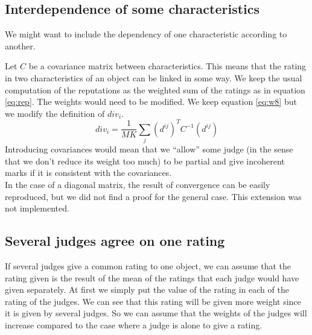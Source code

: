 \documentclass[12pt,a4paper]{article}
\newcommand{\quotes}[1]{``#1''}
\begin{document}
\subsection{Interdependence of some characteristics}
We might want to include the dependency of one characteristic according to another.

Let $C$ be a covariance matrix between characteristics. This means that the rating in two characteristics of an object can be linked in some way. 
We keep the usual computation of the reputations as the weighted sum of the ratings as in equation \ref{eq:rep}. The weights would need to be modified. We keep equation \ref{eq:w8} but we modify the definition of $div_i$.
$$div_i =  \frac{1}{MK}\sum_{j} (d^{ij})^T C^{-1} (d^{ij})$$
Introducing covariances would mean that we \quotes{allow} some judge (in the sense that we don't reduce its weight too much) to be partial and give incoherent marks if it is consistent with the covariances.\\
In the case of a diagonal matrix, the result of convergence can be easily reproduced, but we did not find a proof for the general case. This extension was not implemented.


\subsection{Several judges agree on one rating}
If several judges give a common rating to one object, we can assume that the rating given is the result of the mean of the ratings that each judge would have given separately. At first we simply put the value of the rating in each of the rating of the judges. We can see that this rating will be given more weight since it is given by several judges. So we can assume that the weights of the judges will increase compared to the case where a judge is alone to give a rating. 
\end{document}
